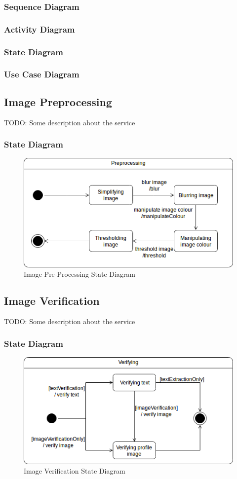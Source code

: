 \documentclass{article}
\begin{document}
\subsubsection{Sequence Diagram}
\subsubsection{Activity Diagram}
\subsubsection{State Diagram}
\subsubsection{Use Case Diagram}

\subsection{Image Preprocessing}
TODO: Some description about the service
\subsubsection{State Diagram}
\begin{figure}[!h]
	\centering
	\includegraphics[scale=0.5]{img/StateModelPreprocess.png}
	\caption{Image Pre-Processing State Diagram}
\end{figure}

\subsection{Image Verification}
TODO: Some description about the service
\subsubsection{State Diagram}
\begin{figure}[!h]
	\centering
	\includegraphics[scale=0.5]{img/StateModelVerify.png}
	\caption{Image Verification State Diagram}
\end{figure}
\end{document}
